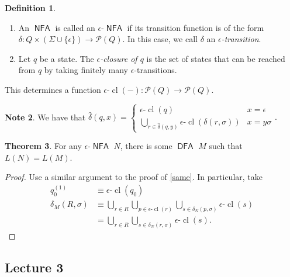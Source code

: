 \documentclass[10pt,letterpaper,cm]{nupset}
\theoremstyle{definition}
\newtheorem{definition}{Definition}[subsection]
\newtheorem{note}[definition]{Note}
\theoremstyle{theorem}
\newtheorem{theorem}[definition]{Theorem}
\theoremstyle{remark}
\renewcommand{\P}{\mathcal P}
\newcommand{\1}{\mathbf{1}}
\newcommand{\0}{\vec 0}
\DeclareMathOperator{\cl}{cl}
\DeclareMathOperator{\DFA}{\mathsf{DFA}}
\DeclareMathOperator{\NFA}{\mathsf{NFA}}
\begin{document}
\begin{definition} $ $
\begin{enumerate}
\item An $\NFA$ is called an \textit{$\epsilon{\text{-}}\NFA$} if its transition function is of the form $\delta: Q\times \left(\Sigma \cup \{\epsilon\}\right) \to \P(Q)$. In this case, we call $\delta$ an \textit{$\epsilon$-transition}.
\item  Let $q$ be a state. The \textit{$\epsilon$-closure of $q$} is the set of states that can be reached from $q$ by taking finitely many $\epsilon$-transitions. 
\end{enumerate}
\end{definition}

This determines a function $\epsilon{\text{-}}\cl(-): \P(Q) \to \P(Q)$.

\smallskip

\begin{note}
We have that $\hat{\delta}(q, x) = \begin{cases} \epsilon \text{-}\cl(q) & x = \epsilon
\\ \bigcup_{r\in \hat{\delta}(q, y)} \epsilon \text{-}\cl(\delta(r, \sigma)) & x = y\sigma 
\end{cases}.$
\end{note}

\begin{theorem}
For any $\epsilon{\text{-}}\NFA$ $N$, there is some $\DFA$ $M$ such that $L(N) = L(M)$.
\end{theorem}
\begin{proof}
Use a similar argument to the proof of \cref{same}. In particular, take
\begin{align*}
q_0^{(1)} & \equiv \epsilon \text{-}\cl(q_0)
\\ \delta_M(R, \sigma)  & \equiv  \bigcup_{r\in R}\bigcup_{p\in \epsilon \text{-}\cl(r)} \bigcup_{s\in \delta_N(p, \sigma)} \epsilon \text{-}\cl(s)
\\ & = \bigcup_{r\in R} \bigcup_{s\in \delta_N(r, \sigma)} \epsilon \text{-}\cl(s)
.\end{align*}
\end{proof}

\subsection{Lecture 3}
\end{document}
